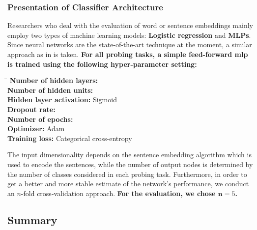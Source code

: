 \subsubsection{Presentation of Classifier Architecture}
\label{sec:probing_tasks_classifier}

Researchers who deal with the evaluation of word or sentence embeddings mainly employ two types of machine learning models: \textbf{Logistic regression} and \textbf{MLPs}. Since neural networks are the state-of-the-art technique at the moment, a similar approach as in \citep{Perone.2018} is taken. \textbf{For all probing tasks, a simple feed-forward \gls{mlp} is trained using the following hyper-parameter setting:}

\begin{tabbing}
	\hspace*{4.5cm}\=\kill
	\textbf{Number of hidden layers:} 	 						\\[4mm]
	\textbf{Number of hidden units:}		 					\\[4mm]
	\textbf{Hidden layer activation:}		\> Sigmoid 				\\[4mm]
	\textbf{Dropout rate:}				 					\\[4mm]
	\textbf{Number of epochs:}			 					\\[4mm]
	\textbf{Optimizer:} 				\> Adam 					\\[4mm]
	\textbf{Training loss:} 			\> Categorical cross-entropy
\end{tabbing}

The input dimensionality depends on the sentence embedding algorithm which is used to encode the sentences, while the number of output nodes is determined by the number of classes considered in each probing task. Furthermore, in order to get a better and more stable estimate of the network's performance, we conduct an $n$-fold cross-validation approach. \textbf{For the evaluation, we chose $\bm{n} = 5$.}

\subsection{Summary}
\label{sec:probing_tasks_summary}


